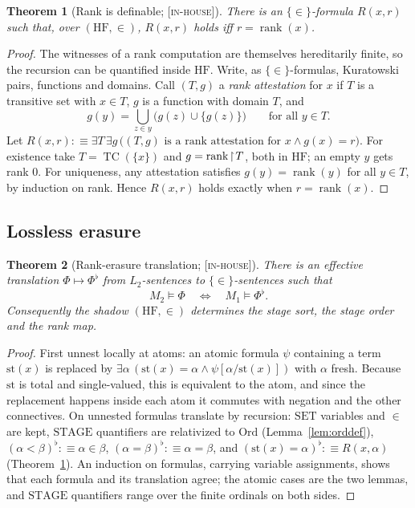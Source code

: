 \documentclass[11pt]{article}
\newcommand{\HF}{\mathrm{HF}}                 \newcommand{\rank}{\operatorname{rank}}
\newcommand{\TC}{\operatorname{TC}}
\newcommand{\gradetag}[1]{\textnormal{\textsc{[#1]}}}
\newcommand{\inhouse}{\gradetag{in-house}}
\newtheorem{theorem}{Theorem}[section]
\theoremstyle{definition}
\begin{document}
\begin{theorem}[Rank is definable; \inhouse]\label{thm:rankdef}
There is an $\{\in\}$-formula $R(x,r)$ such that, over $(\HF,\in)$, $R(x,r)$ holds iff
$r=\rank(x)$.
\end{theorem}

\begin{proof}
The witnesses of a rank computation are themselves hereditarily finite, so the recursion can be
quantified inside $\HF$. Write, as $\{\in\}$-formulas, Kuratowski pairs, functions and domains.
Call $(T,g)$ a \emph{rank attestation} for $x$ if $T$ is a transitive set with $x\in T$, $g$ is a
function with domain $T$, and
\[
  g(y)=\textstyle\bigcup_{z\in y}\bigl(g(z)\cup\{g(z)\}\bigr)\qquad\text{for all }y\in T.
\]
Let $R(x,r):\equiv\exists T\,\exists g\,\bigl((T,g)\text{ is a rank attestation for }x\wedge
g(x)=r\bigr)$. For existence take $T=\TC(\{x\})$ and $g=\rank\restr T$, both in $\HF$; an empty $y$
gets rank $0$. For uniqueness, any attestation satisfies $g(y)=\rank(y)$ for all $y\in T$, by
induction on rank. Hence $R(x,r)$ holds exactly when $r=\rank(x)$.
\end{proof}

\subsection{Lossless erasure}

\begin{theorem}[Rank-erasure translation; \inhouse]\label{thm:translation}
There is an effective translation $\Phi\mapsto\Phi^\flat$ from $L_2$-sentences to
$\{\in\}$-sentences such that
\[
  M_2\models\Phi\quad\Longleftrightarrow\quad M_1\models\Phi^\flat.
\]
Consequently the shadow $(\HF,\in)$ determines the stage sort, the stage order and the rank map.
\end{theorem}

\begin{proof}
First unnest locally at atoms: an atomic formula $\psi$ containing a term $\mathrm{st}(x)$ is
replaced by $\exists\alpha\,(\mathrm{st}(x)=\alpha\wedge\psi[\alpha/\mathrm{st}(x)])$ with $\alpha$
fresh. Because $\mathrm{st}$ is total and single-valued, this is equivalent to the atom, and since
the replacement happens inside each atom it commutes with negation and the other connectives. On
unnested formulas translate by recursion: $\mathrm{SET}$ variables and $\in$ are kept,
$\mathrm{STAGE}$ quantifiers are relativized to $\mathrm{Ord}$ (Lemma~\ref{lem:orddef}),
$(\alpha<\beta)^\flat:\equiv\alpha\in\beta$, $(\alpha=\beta)^\flat:\equiv\alpha=\beta$, and
$(\mathrm{st}(x)=\alpha)^\flat:\equiv R(x,\alpha)$ (Theorem~\ref{thm:rankdef}). An induction on
formulas, carrying variable assignments, shows that each formula and its translation agree; the
atomic cases are the two lemmas, and $\mathrm{STAGE}$ quantifiers range over the finite ordinals on
both sides.
\end{proof}
\end{document}

